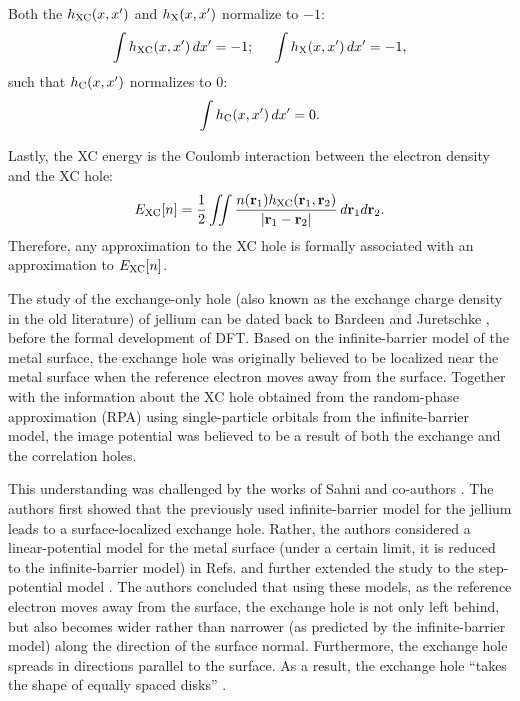 \documentclass[aip, amsmath, amssymb, reprint, longbibliography]{revtex4-2}
\begin{document}
 Both the $h_{\rm XC}(x,x')$ and $h_{\rm X}(x,x')$ normalize to $-1$:
\begin{equation}
\int h_{\rm XC}(x,x')\,dx' = -1; \hspace{0.2in} \int h_{\rm X}(x,x')\,dx' = -1,
\label{eq:hxcnorm}
\end{equation}
such that $h_{\rm C}(x,x')$ normalizes to 0:
\begin{equation}
\int h_{\rm C}(x,x')\,dx' = 0.
\label{eq:hcnorm}
\end{equation}

Lastly, the XC energy is the Coulomb interaction between the electron density and the XC hole:
\begin{equation}
E_{\rm XC}[n]=\frac{1}{2}\iint\frac{n(\mathbf{r}_1)h_{\rm XC}(\mathbf{r}_1,\mathbf{r}_2)}{\left|\mathbf{r}_1-\mathbf{r}_2\right|}\,d\mathbf{r}_1d\mathbf{r}_2.
\label{eq:excinhole}
\end{equation}
Therefore, any approximation to the XC hole is formally associated with an approximation to $E_{\rm XC}[n]$.

The study of the exchange-only hole (also known as the exchange charge density in the old literature) of jellium can be dated back to Bardeen \cite{B36} and Juretschke \cite{J53}, before the formal development of DFT. Based on the infinite-barrier model of the metal surface, the exchange hole was originally believed to be localized near the metal surface when the reference electron moves away from the surface. Together with the information about the XC hole obtained from the random-phase approximation (RPA) \cite{IM78} using single-particle orbitals from the infinite-barrier model, the image potential was believed to be a result of both the exchange and the correlation holes. 

This understanding was challenged by the works of Sahni and co-authors \cite{SB84,SB85, HS88}. The authors first showed that the previously used infinite-barrier model for the jellium leads to a surface-localized exchange hole. Rather, the authors considered a linear-potential model for the metal surface (under a certain limit, it is reduced to the infinite-barrier model) in Refs.  and further extended the study to the step-potential model \cite{HS88}. The authors concluded that using these models, as the reference electron moves away from the surface, the exchange hole is not only left behind, but also becomes wider rather than narrower (as predicted by the infinite-barrier model) along the direction of the surface normal. Furthermore, the exchange hole spreads in directions parallel to the surface. As a result, the exchange hole ``takes the shape of equally spaced disks'' \cite{HS88}. 
\end{document}
